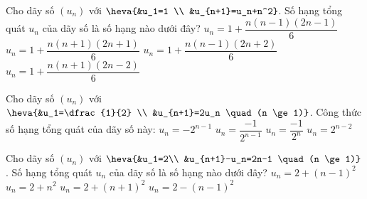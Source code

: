 \begin{ex}%
	Cho dãy số $(u_n)$ với $\heva{&u_1=1 \\ &u_{n+1}=u_n+n^2}$. Số hạng tổng quát $u_n$ của dãy số là số hạng  nào dưới đây?
	 \choice
		{\True $u_n=1+\dfrac{n(n-1)(2n-1)}{6}$} 
		 {$u_n=1+\dfrac{n(n+1)(2n+1)}{6}$}
		{$u_n=1+\dfrac{n(n-1)(2n+2)}{6}$} 
		{$u_n=1+\dfrac{n(n+1)(2n-2)}{6}$} 
\end{ex}

\begin{ex}%
	 Cho dãy số $(u_n)$ với $\heva{&u_1=\dfrac{1}{2} \\
	&u_{n+1}=2u_n \quad (n \ge 1)}$. Công thức số hạng tổng quát của dãy số này: 
	 \choice
		 {$u_n=-2^{n-1}$}
		{$u_n=\dfrac{-1}{2^{n-1}}$} 
		{$u_n=\dfrac{-1}{2^n}$} 
		{\True $u_n=2^{n-2}$} 
\end{ex}

\begin{ex}%
	Cho  dãy số $(u_n)$ với $\heva{&u_1=2\\
	&u_{n+1}-u_n=2n-1 \quad (n  \ge 1)}$. Số hạng tổng quát $u_n$ của dãy số là số hạng nào dưới đây?
	 \choice
		{\True  $u_n=2+(n-1)^2$}
		{$u_n=2+n^2$} 
		{$u_n=2+(n+1)^2$} 
		 {$u_n=2-(n-1)^2$}
\end{ex}

